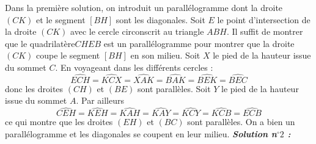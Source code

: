 \begin{sol}
Dans la première solution, on introduit un parallélogramme dont la droite $(CK)$ et le segment $[BH]$ sont les diagonales.
Soit $E$ le point d'intersection de la droite $(CK)$ avec le cercle circonscrit au triangle $ABH$. Il suffit de montrer que le quadrilatère$CHEB$ est un parallélogramme pour montrer que la droite $(CK)$ coupe le segment $[BH]$ en son milieu.
Soit $X$ le pied de la hauteur issue du sommet $C$. En voyageant dans les différents cercles :
$$\widehat{ECH}=\widehat{KCX}=\widehat{XAK}=\widehat{BAK}=\widehat{BEK}=\widehat{BEC}$$
donc les droites $(CH)$ et $(BE)$ sont parallèles.
Soit $Y$ le pied de la hauteur issue du sommet $A$.
Par ailleurs $$\widehat{CEH}=\widehat{KEH}=\widehat{KAH}=\widehat{KAY}=\widehat{KCY}=\widehat{KCB}=\widehat{ECB}$$
ce qui montre que les droites $(EH)$ et $(BC)$ sont parallèles.
On a bien un parallélogramme et les diagonales se coupent en leur milieu.
\newpage
\textit{\textbf{Solution n$^\circ 2$ :}}

\begin{center}
\end{center}


\end{sol}
